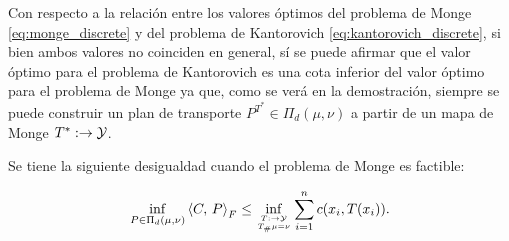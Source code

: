 Con respecto a la relación entre los valores óptimos del problema de Monge \eqref{eq:monge_discrete} y del problema de Kantorovich \eqref{eq:kantorovich_discrete}, si bien ambos valores no coinciden en general, sí se puede afirmar que el valor óptimo para el problema de Kantorovich es una cota inferior del valor óptimo para el problema de Monge ya que, como se verá en la demostración, siempre se puede construir un plan de transporte $P^{T^*}\in\Pi_d(\mu,\nu)$ a partir de un mapa de Monge $T^*:\to\mathcal{Y}$.

\begin{prop}
	\label{prop:monge_kantorovich_discrete_inequality}
	Se tiene la siguiente desigualdad cuando el problema de Monge es factible:

	\begin{equation*}
		\inf_{P\in \Pi_d(\mu,\nu)} \dotproduct{C}{P}_F
		\leq \inf_{\feasible{T:\xspace\to\yspace}{T_\#\mu=\nu}}
		\sum_{i=1}^n c(x_i,T(x_i)).
	\end{equation*}

\end{prop}

